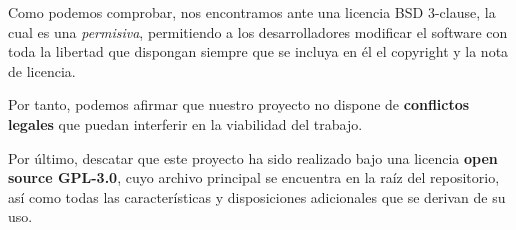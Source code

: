 Como podemos comprobar, nos encontramos ante una licencia BSD 3-clause, la cual es una \textit{permisiva}, permitiendo a los desarrolladores modificar el software con toda la libertad que dispongan siempre que se incluya en él el copyright y la nota de licencia.

Por tanto, podemos afirmar que nuestro proyecto no dispone de \textbf{conflictos legales} que puedan interferir en la viabilidad del trabajo.

Por último, descatar que este proyecto ha sido realizado bajo una licencia \textbf{open source GPL-3.0}, cuyo archivo principal se encuentra en la raíz del repositorio, así como todas las características y disposiciones adicionales que se derivan de su uso.